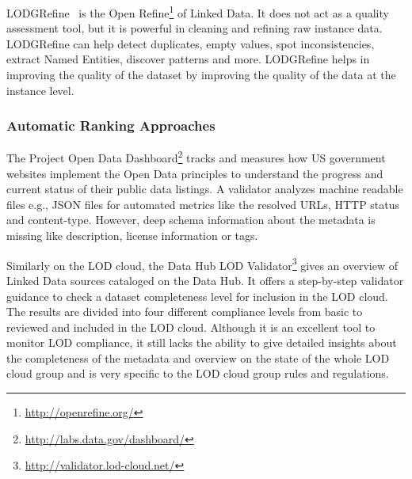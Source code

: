\documentclass[onecolumn, crcready]{../../Tools/LaTEX/iosart2c}
\begin{document}
LODGRefine~\cite{Verlic:iSemantics:12} is the Open Refine\footnote{\url{http://openrefine.org/}} of Linked Data. It does not act as a quality assessment tool, but it is powerful in cleaning and refining raw instance data. LODGRefine can help detect duplicates, empty values, spot inconsistencies, extract Named Entities, discover patterns and more. LODGRefine helps in improving the quality of the dataset by improving the quality of the data at the instance level.

\subsubsection{Automatic Ranking Approaches}

The Project Open Data Dashboard\footnote{\url{http://labs.data.gov/dashboard/}} tracks and measures how US government websites implement the Open Data principles to understand the progress and current status of their public data listings. A validator analyzes machine readable files e.g., JSON files for automated metrics like the resolved URLs, HTTP status and content-type. However, deep schema information about the metadata is missing like description, license information or tags.

Similarly on the LOD cloud, the Data Hub LOD Validator\footnote{\url{http://validator.lod-cloud.net/}} gives an overview of Linked Data sources cataloged on the Data Hub. It offers a step-by-step validator guidance to check a dataset completeness level for inclusion in the LOD cloud. The results are divided into four different compliance levels from basic to reviewed and included in the LOD cloud. Although it is an excellent tool to monitor LOD compliance, it still lacks the ability to give detailed insights about the completeness of the metadata and overview on the state of the whole LOD cloud group and is very specific to the LOD cloud group rules and regulations.\\

\end{document}
